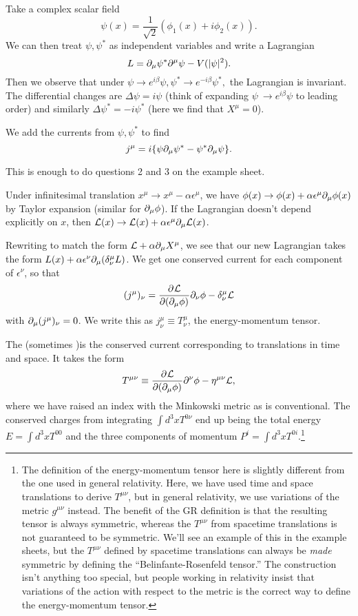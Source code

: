 \begin{exm}
Take a complex scalar field $$\psi(x)=\frac{1}{\sqrt{2}}(\phi_1(x)+i\phi_2(x)).$$ We can then treat $\psi, \psi^*$ as independent variables and write a Lagrangian
$$L=\partial_\mu \psi^* \partial^\mu \psi - V(|\psi|^2).$$
Then we observe that under $\psi\to e^{i\beta}\psi, \psi^* \to e^{-i\beta}\psi^*,$ the Lagrangian is invariant. The differential changes are $\Delta \psi = i \psi$ (think of expanding $\psi\ \to e^{i\beta}\psi$ to leading order) and similarly $\Delta \psi^*=-i\psi^*$ (here we find that $X^\mu=0$).

We add the currents from $\psi, \psi^*$ to find
$$j^\mu = i\{ \psi \partial_\mu \psi^* - \psi^* \partial_\mu \psi\}.$$
\end{exm}
This is enough to do questions 2 and 3 on the example sheet.
\begin{exm}
Under infinitesimal translation $x^\mu \to x^\mu -\alpha \epsilon^\mu$, we have $\phi(x)\to \phi(x)+\alpha \epsilon^\mu \partial_\mu \phi(x)$ by Taylor expansion (similar for $\partial_\mu\phi$). If the Lagrangian doesn't depend explicitly on $x$, then $\mathcal L(x)\to \mathcal L(x) +\alpha \epsilon^\mu \partial_\mu \mathcal L(x)$.

Rewriting to match the form $\mathcal L+\alpha \partial_\mu X^\mu$, we see that our new Lagrangian takes the form
$L(x)+\alpha \epsilon^\nu \partial_\mu (\delta^\mu_\nu L)$. We get one conserved current for each component of $\epsilon^\nu$, so that
$$(j^\mu)_\nu = \frac{\partial^{} \mathcal L}{\partial (\partial_\mu \phi) ^{}}\partial_\nu \phi - \delta^\mu_\nu \mathcal L$$ with $\partial_\mu(j^\mu)_\nu=0$.
We write this as $j^\mu_\nu \equiv T^\mu_\nu$, the energy-momentum tensor. 

\begin{defn}
The  (sometimes )is the conserved current corresponding to translations in time and space. It takes the form 
$$T^{\mu\nu} \equiv \frac{\partial^{} \mathcal L}{\partial (\partial_\mu \phi) ^{}}\partial^\nu \phi - \eta^{\mu\nu} \mathcal L,$$
where we have raised an index with the Minkowski metric as is conventional. The conserved charges from integrating $\int d^3x T^{0\nu}$ end up being the total energy $E=\int d^3x T^{00}$ and the three components of momentum $P^i=\int d^3x T^{0i}$.\footnote{The definition of the energy-momentum tensor here is slightly different from the one used in general relativity. Here, we have used time and space translations to derive $T^{\mu\nu}$, but in general relativity, we use variations of the metric $g^{\mu\nu}$ instead. The benefit of the GR definition is that the resulting tensor is always symmetric, whereas the $T^{\mu\nu}$ from spacetime translations is not guaranteed to be symmetric. We'll see an example of this in the example sheets, but the $T^{\mu\nu}$ defined by spacetime translations can always be \emph{made} symmetric by defining the ``Belinfante-Rosenfeld tensor.'' The construction isn't anything too special, but people working in relativity insist that variations of the action with respect to the metric is the correct way to define the energy-momentum tensor.}
\end{defn}
\end{exm}